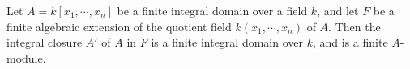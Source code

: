 Let $A = k[x_1, \cdots, x_n]$ be a finite integral domain over a field $k$, and let $F$ be a finite algebraic extension of the quotient field $k(x_1, \cdots, x_n)$ of $A$. Then the integral closure $A'$ of $A$ in $F$ is a finite integral domain over $k$, and is a finite $A$-module.
